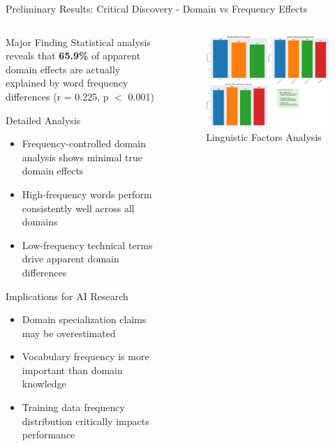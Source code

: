 \documentclass[aspectratio=169]{beamer}
\begin{document}
\begin{frame}{Preliminary Results: Critical Discovery - Domain vs Frequency Effects}
\begin{columns}[c]
\begin{column}{0.5\textwidth}
\begin{alertblock}{Major Finding}
Statistical analysis reveals that \textbf{65.9\%} of apparent domain effects are actually explained by word frequency differences (r = 0.225, p $<$ 0.001)
\end{alertblock}

\begin{block}{Detailed Analysis}
\begin{itemize}
    \item Frequency-controlled domain analysis shows minimal true domain effects
    \item High-frequency words perform consistently well across all domains
    \item Low-frequency technical terms drive apparent domain differences
\end{itemize}
\end{block}

\begin{exampleblock}{Implications for AI Research}
\begin{itemize}
    \item Domain specialization claims may be overestimated
    \item Vocabulary frequency is more important than domain knowledge
    \item Training data frequency distribution critically impacts performance
\end{itemize}
\end{exampleblock}
\end{column}

\begin{column}{0.48\textwidth}
\begin{figure}
\includegraphics[width=\textwidth]{comprehensive_figures/figure3_linguistic.png}
\caption{Linguistic Factors Analysis}
\end{figure}
\end{column}
\end{columns}
\end{frame}
\end{document}

